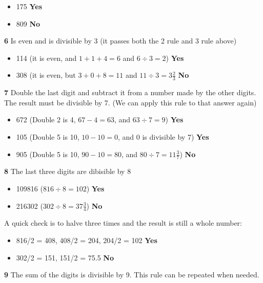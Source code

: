 \begin{itemize}
  \item 175 \textbf{Yes}
  \item 809 \textbf{No}
\end{itemize}

\textbf{6} Is even and is divisible by 3 (it passes both the 2 rule and 3 rule above)

\begin{itemize}
  \item 114 (it is even, and $1+1+4=6$ and $6 \div 3 =2$) \textbf{Yes}
  \item 308 (it is even, but $3+0+8=11$ and $11 \div 3 = 3\frac{2}{3}$ \textbf{No}
\end{itemize}

\textbf{7} Double the last digit and subtract it from a number made by the other digits. The result must be divisible by 7. (We can apply this rule to that answer again)

\begin{itemize}
  \item 672 (Double 2 is 4, $67-4=63$, and $63 \div 7 = 9$) \textbf{Yes}
  \item 105 (Double 5 is 10, $10-10=0$, and 0 is divisible by 7) \textbf{Yes}
  \item 905 (Double 5 is 10, $90-10=80$, and $80 \div 7 =11\frac{3}{7}$) \textbf{No}
\end{itemize}

\vspace{7 mm}

\textbf{8} The last three digits are dibisible by 8

\begin{itemize}
  \item 109816 ($816 \div 8=102$) \textbf{Yes}
  \item 216302 ($302\div 8=37\frac{3}{4}$) \textbf{No}
\end{itemize}

A quick check is to halve three times and the result is still a whole number:

\begin{itemize}
  \item 816/2 = 408, 408/2 = 204, 204/2 = 102 \textbf{Yes}
  \item 302/2 = 151, 151/2 = 75.5 \textbf{No}
\end{itemize}

\vspace{7 mm}

\textbf{9} The sum of the digits is divisible by 9. This rule can be repeated when needed.

